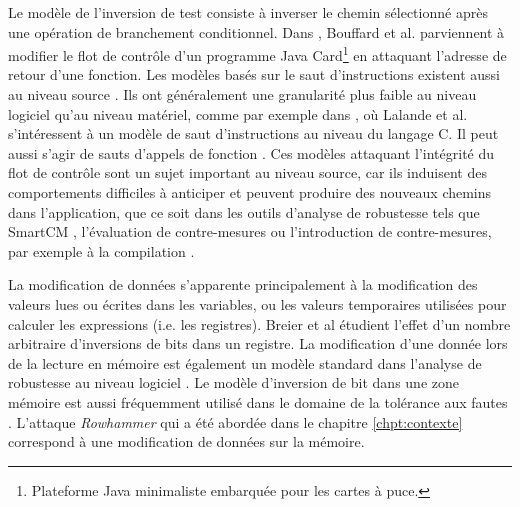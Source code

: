                 Le modèle de l'inversion de test \cite{Berthome/ARES12, Potet/ICST14, Dureuil/PPLCC16} consiste à inverser le chemin sélectionné après une opération de branchement conditionnel. 
                Dans \cite{Bouffard/SCRAA11}, Bouffard et al. parviennent à modifier le flot de contrôle d'un programme Java Card\footnote{Plateforme Java minimaliste embarquée pour les cartes à puce.} en attaquant l'adresse de retour d'une fonction.
                Les modèles basés sur le saut d'instructions existent aussi au niveau source \cite{Moro/FDTC13, Potet/ICST14, Barry/CSCS16, Breier/TDSC19}.
                Ils ont généralement une granularité plus faible au niveau logiciel qu'au niveau matériel, comme par exemple dans \cite{lalande}, où Lalande et al. s'intéressent à un modèle de saut d'instructions au niveau du langage C. Il peut aussi s'agir de sauts d'appels de fonction \cite{Dureuil/PPLCC16}.
                Ces modèles attaquant l'intégrité du flot de contrôle sont un sujet important au niveau source, car ils induisent des comportements difficiles à anticiper et peuvent produire des nouveaux chemins dans l'application, que ce soit dans les outils d'analyse de robustesse tels que SmartCM \cite{Machemie/IFS11}, l'évaluation de contre-mesures \cite{Sere/IJSIA11} ou l'introduction de contre-mesures, par exemple à la compilation \cite{Werner/ICSCRAA15}. 
                
                La modification de données s'apparente principalement à la modification des valeurs lues ou écrites dans les variables, ou les valeurs temporaires utilisées pour calculer les expressions (i.e. les registres).
                Breier et al \cite{Breier/TDSC19} étudient l'effet d'un nombre arbitraire d'inversions de bits dans un registre. 
                La modification d'une donnée lors de la lecture en mémoire est également un modèle standard dans l'analyse de robustesse au niveau logiciel \cite{Moro/FDTC13, Berthome/ARES12}. 
                Le modèle d'inversion de bit dans une zone mémoire est aussi fréquemment utilisé dans le domaine de la tolérance aux fautes \cite{Benso/TODAES98, Georgakoudis/ICHPCNSA17}.
                L'attaque \textit{Rowhammer} \cite{Kim/ACM14} qui a été abordée dans le chapitre \ref{chpt:contexte} correspond à une modification de données sur la mémoire.
                
